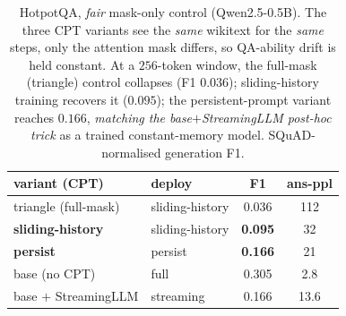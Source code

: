 \begin{table}[t]
\centering
\small
\begin{tabular}{llcc}
\toprule
variant (CPT) & deploy & F1 & ans-ppl \\
\midrule
triangle (full-mask) & sliding-history & 0.036 & 112 \\
\textbf{sliding-history} & sliding-history & \textbf{0.095} & 32 \\
\textbf{persist} & persist & \textbf{0.166} & 21 \\
\midrule
base (no CPT) & full & 0.305 & 2.8 \\
base $+$ StreamingLLM & streaming & 0.166 & 13.6 \\
\bottomrule
\end{tabular}
\caption{HotpotQA, \emph{fair} mask-only control (Qwen2.5-0.5B). The three CPT variants see the \emph{same} wikitext for the \emph{same} steps, only the attention mask differs, so QA-ability drift is held constant. At a $256$-token window, the full-mask (triangle) control collapses (F1 $0.036$); sliding-history training recovers it ($0.095$); the persistent-prompt variant reaches $0.166$, \emph{matching the base$+$StreamingLLM post-hoc trick} as a trained constant-memory model. SQuAD-normalised generation F1.}
\label{tab:hotpotfair}
\end{table}
